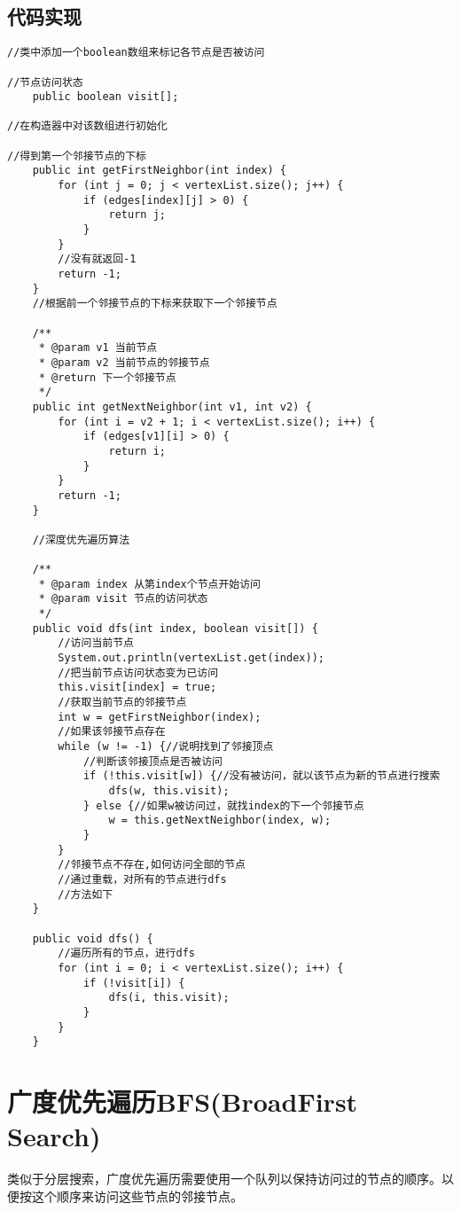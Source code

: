 \documentclass[a4paper]{report}
\begin{document}
\subsection{代码实现}
\begin{lstlisting}
//类中添加一个boolean数组来标记各节点是否被访问

//节点访问状态
    public boolean visit[];

//在构造器中对该数组进行初始化

//得到第一个邻接节点的下标
    public int getFirstNeighbor(int index) {
        for (int j = 0; j < vertexList.size(); j++) {
            if (edges[index][j] > 0) {
                return j;
            }
        }
        //没有就返回-1
        return -1;
    }
    //根据前一个邻接节点的下标来获取下一个邻接节点

    /**
     * @param v1 当前节点
     * @param v2 当前节点的邻接节点
     * @return 下一个邻接节点
     */
    public int getNextNeighbor(int v1, int v2) {
        for (int i = v2 + 1; i < vertexList.size(); i++) {
            if (edges[v1][i] > 0) {
                return i;
            }
        }
        return -1;
    }

    //深度优先遍历算法

    /**
     * @param index 从第index个节点开始访问
     * @param visit 节点的访问状态
     */
    public void dfs(int index, boolean visit[]) {
        //访问当前节点
        System.out.println(vertexList.get(index));
        //把当前节点访问状态变为已访问
        this.visit[index] = true;
        //获取当前节点的邻接节点
        int w = getFirstNeighbor(index);
        //如果该邻接节点存在
        while (w != -1) {//说明找到了邻接顶点
            //判断该邻接顶点是否被访问
            if (!this.visit[w]) {//没有被访问，就以该节点为新的节点进行搜索
                dfs(w, this.visit);
            } else {//如果w被访问过，就找index的下一个邻接节点
                w = this.getNextNeighbor(index, w);
            }
        }
        //邻接节点不存在,如何访问全部的节点
        //通过重载，对所有的节点进行dfs
        //方法如下
    }

    public void dfs() {
        //遍历所有的节点，进行dfs
        for (int i = 0; i < vertexList.size(); i++) {
            if (!visit[i]) {
                dfs(i, this.visit);
            }
        }
    }
\end{lstlisting}
\section{广度优先遍历BFS(BroadFirst Search)}
类似于分层搜索，广度优先遍历需要使用一个队列以保持访问过的节点的顺序。以便按这个顺序来访问这些节点的邻接节点。
\end{document}
